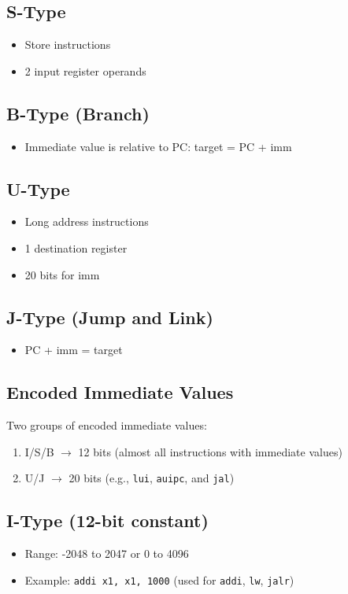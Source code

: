 \documentclass{article}
\begin{document}
\subsection*{S-Type}
\begin{itemize}
    \item Store instructions
    \item 2 input register operands
\end{itemize}

\subsection*{B-Type (Branch)}
\begin{itemize}
    \item Immediate value is relative to PC: target = PC + imm
\end{itemize}

\subsection*{U-Type}
\begin{itemize}
    \item Long address instructions
    \item 1 destination register
    \item 20 bits for imm
\end{itemize}

\subsection*{J-Type (Jump and Link)}
\begin{itemize}
    \item PC + imm = target
\end{itemize}

\subsection*{Encoded Immediate Values}
Two groups of encoded immediate values:
\begin{enumerate}
    \item I/S/B $\rightarrow$ 12 bits (almost all instructions with immediate values)
    \item U/J $\rightarrow$ 20 bits (e.g., \texttt{lui}, \texttt{auipc}, and \texttt{jal})
\end{enumerate}

\subsection*{I-Type (12-bit constant)}
\begin{itemize}
    \item Range: -2048 to 2047 or 0 to 4096
    \item Example: \texttt{addi x1, x1, 1000} (used for \texttt{addi}, \texttt{lw}, \texttt{jalr})
\end{itemize}
\end{document}
